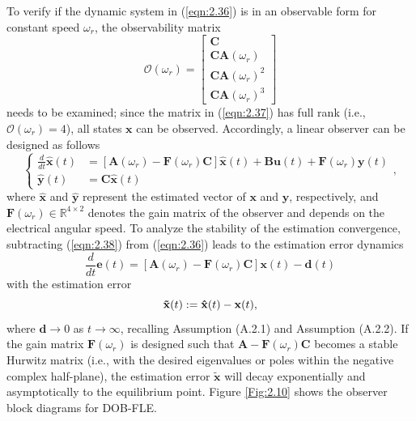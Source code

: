 To verify if the dynamic system in (\ref{eqn:2.36}) is in an observable form for constant speed $\omega_r$, the observability matrix 
\begin{equation}\label{eqn:2.37}
\mathbf{\mathcal{O}}(\omega_r) = \begin{bmatrix}
\mathbf{C} \\
\mathbf{CA}(\omega_r) \\
\mathbf{CA}(\omega_r)^2 \\
\mathbf{CA}(\omega_r)^3
\end{bmatrix}
\end{equation}
needs to be examined; since the matrix in (\ref{eqn:2.37}) has full rank (i.e., $\mathbf{\mathcal{O}}(\omega_r) = 4$), all states $\mathbf{x}$ can be observed. Accordingly, a linear observer can be designed as follows
\begin{equation}\label{eqn:2.38}
\left\{
\begin{aligned}
\frac{d }{dt}\hat{\mathbf{x}}(t) &= \left[ \mathbf{A}(\omega_r) - \mathbf{F}(\omega_r) \mathbf{C} \right] \hat{\mathbf{x}}(t) + \mathbf{B} \mathbf{u}(t) + \mathbf{F}(\omega_r) \mathbf{y}(t) \\
\hat{\mathbf{y}}(t) &= \mathbf{C} \hat{\mathbf{x}}(t)
\end{aligned},
\right.
\end{equation}
where $\hat{\mathbf{x}}$ and $\hat{\mathbf{y}}$ represent the estimated vector of $\mathbf{x}$ and $\mathbf{y}$, respectively, and $\mathbf{F}(\omega_r) \in \mathbb{R}^{4 \times 2}$ denotes the gain matrix of the observer and depends on the electrical angular speed. To analyze the stability of the estimation convergence, subtracting (\ref{eqn:2.38}) from (\ref{eqn:2.36}) leads to the estimation error dynamics
\begin{equation}\label{eqn:2.39}
\frac{d}{dt}\mathbf{e}(t) = \left[\mathbf{A}(\omega_r) - \mathbf{F}(\omega_r)\mathbf{C}\right] \mathbf{x}(t) - \mathbf{d}(t)
\end{equation}
with the estimation error
\begin{equation}\notag
\mathbf{\tilde x}(t) :=\mathbf{\hat x}(t) - \mathbf{x}(t),
\end{equation}
where \(\mathbf{d} \rightarrow 0\) as \( t \rightarrow \infty \), recalling Assumption (A.2.1) and Assumption (A.2.2). If the gain matrix \(\mathbf{F}(\omega_r)\) is designed such that \(\mathbf{A}-\mathbf{F}(\omega_r)\mathbf{C}\) becomes a stable Hurwitz matrix (i.e., with the desired eigenvalues or poles within the negative complex half-plane), the estimation error \(\mathbf{\tilde{x}}\) will decay exponentially and asymptotically to the equilibrium point. Figure \ref{Fig:2.10} shows the observer block diagrams for DOB-FLE. 
